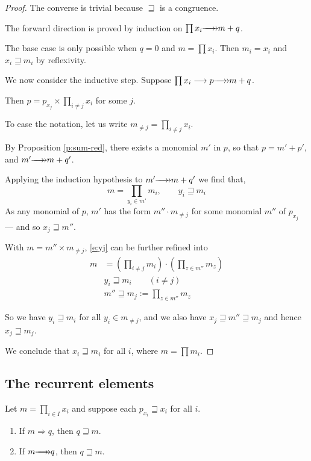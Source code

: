 \documentclass[numbers=enddot]{scrartcl}
\newcommand{\LRA}{\Longrightarrow}
\newcommand{\cov}{\sqsupseteq}
\begin{document}
\begin{proof}
The converse is trivial because $\cov$ is a congruence.

The forward direction is proved by induction on $\prod x_i \thra m + q$.

The base case is only possible when $q = 0$ and $m = \prod x_i$. Then $m_i = x_i$ and $x_i \cov m_i$ by reflexivity.

We now consider the inductive step. Suppose $\prod x_i \lra p \thra m + q$.

Then $p = p_{x_j} \times \prod_{i \neq j} x_i$ for some $j$.

To ease the notation, let us write $m_{\neq j} = \prod_{i \neq j} x_i$.

By Proposition \ref{p:sum-red}, there exists a monomial $m'$ in $p$,
so that $p = m' + p'$, and $m' \thra m + q'$.

Applying the induction hypothesis to $m' \thra m + q'$ we find that,
\begin{equation}
   \label{e:yj}
   m = \prod_{y_i \in m'} m_i, \qquad y_i \cov m_i
\end{equation}
As any monomial of $p$, $m'$ has the form $m'' \cdot m_{\neq j}$
for some monomial $m''$ of $p_{x_j}$ --- and so $x_j \cov m''$.

With $m = m'' \times m_{\neq j}$, \eqref{e:yj} can be further refined into
\begin{align*}
   m &= \left(\prod_{i \neq j} m_i\right)
 \cdot \left(\prod_{z \in m''} m_z\right)  \\
   &y_i \cov m_i \qquad (i \neq j) \\
   &m'' \cov m_j := \prod_{z \in m''} m_z
\end{align*}

So we have $y_i \cov m_i$ for all $y_i \in m_{\neq j}$, and
we also have $x_j \cov m'' \cov m_j$ and hence $x_j \cov m_j$.

We conclude that $x_i \cov m_i$ for all $i$, where $m = \prod m_i$. \qedhere
\end{proof}

\subsection{The recurrent elements}

\begin{prop}
 Let $m = \prod_{i \in I} x_i$ and suppose each $p_{x_i} \cov x_i$ for all $i$.
 \begin{enumerate}
   \item If $m \LRA q$, then $q \cov m$.
   \item If $m \thra q$, then $q \cov m$.
 \end{enumerate}
\end{prop}
\end{document}
